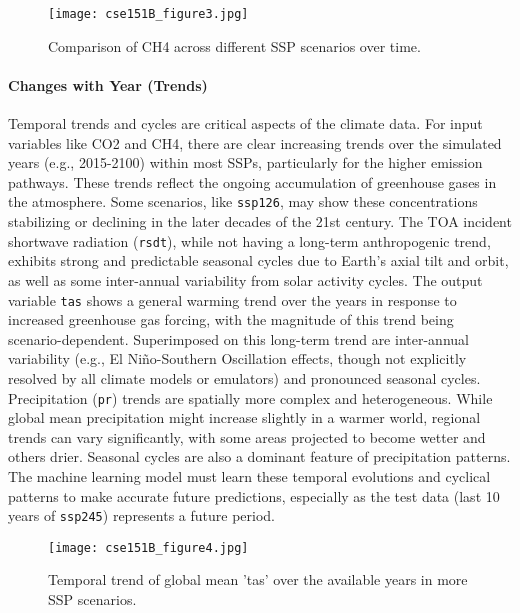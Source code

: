 \documentclass{article}
\begin{document}
\begin{figure}[h!]
  \centering
  \texttt{[image: cse151B\_figure3.jpg]} %
  \caption{Comparison of CH4 across different SSP scenarios over time.}
  \label{fig:ssp_comparison}
\end{figure}

\paragraph{Changes with Year (Trends)}
Temporal trends and cycles are critical aspects of the climate data.
For input variables like CO2 and CH4, there are clear increasing trends over the simulated years (e.g., 2015-2100) within most SSPs, particularly for the higher emission pathways. These trends reflect the ongoing accumulation of greenhouse gases in the atmosphere. Some scenarios, like \texttt{ssp126}, may show these concentrations stabilizing or declining in the later decades of the 21st century. The TOA incident shortwave radiation (\texttt{rsdt}), while not having a long-term anthropogenic trend, exhibits strong and predictable seasonal cycles due to Earth's axial tilt and orbit, as well as some inter-annual variability from solar activity cycles.
The output variable \texttt{tas} shows a general warming trend over the years in response to increased greenhouse gas forcing, with the magnitude of this trend being scenario-dependent. Superimposed on this long-term trend are inter-annual variability (e.g., El Niño-Southern Oscillation effects, though not explicitly resolved by all climate models or emulators) and pronounced seasonal cycles.
Precipitation (\texttt{pr}) trends are spatially more complex and heterogeneous. While global mean precipitation might increase slightly in a warmer world, regional trends can vary significantly, with some areas projected to become wetter and others drier. Seasonal cycles are also a dominant feature of precipitation patterns. The machine learning model must learn these temporal evolutions and cyclical patterns to make accurate future predictions, especially as the test data (last 10 years of \texttt{ssp245}) represents a future period.

\begin{figure}[h!]
  \centering
  \texttt{[image: cse151B\_figure4.jpg]} %
  \caption{Temporal trend of global mean 'tas' over the available years in more SSP scenarios.}
  \label{fig:temporal_trend}
\end{figure}
\end{document}
